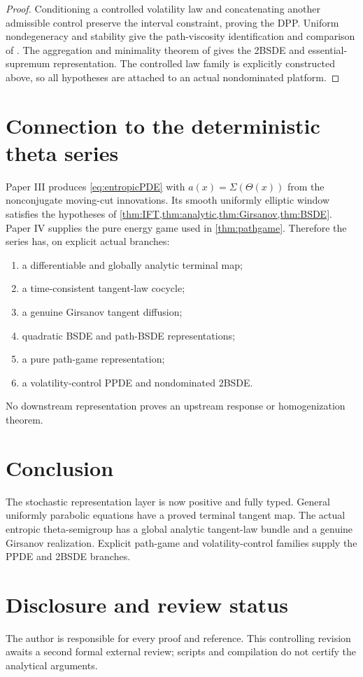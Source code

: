 \documentclass[11pt,reqno]{amsart}
\theoremstyle{definition}
\theoremstyle{remark}
\begin{document}
\begin{proof}
Conditioning a controlled volatility law and concatenating another admissible
control preserve the interval constraint, proving the DPP.  Uniform
nondegeneracy and stability give the path-viscosity identification and
comparison of \cite{EkrenTouziZhang2014I,EkrenTouziZhang2014II}.  The
aggregation and minimality theorem of \cite{SonerTouziZhang2012} gives the
2BSDE and essential-supremum representation.  The controlled law family is
explicitly constructed above, so all hypotheses are attached to an actual
nondominated platform.
\end{proof}

\section{Connection to the deterministic theta series}\label{sec:series}
Paper III produces \eqref{eq:entropicPDE} with
$a(x)=\Sigma(\Theta(x))$ from the nonconjugate moving-cut innovations.  Its
smooth uniformly elliptic window satisfies the hypotheses of
\cref{thm:IFT,thm:analytic,thm:Girsanov,thm:BSDE}.  Paper IV supplies the pure
energy game used in \cref{thm:pathgame}.  Therefore the series has, on explicit
actual branches:
\begin{enumerate}[label=(\roman*)]
\item a differentiable and globally analytic terminal map;
\item a time-consistent tangent-law cocycle;
\item a genuine Girsanov tangent diffusion;
\item quadratic BSDE and path-BSDE representations;
\item a pure path-game representation;
\item a volatility-control PPDE and nondominated 2BSDE.
\end{enumerate}
No downstream representation proves an upstream response or homogenization
theorem.

\section{Conclusion}
The stochastic representation layer is now positive and fully typed.  General
uniformly parabolic equations have a proved terminal tangent map.  The actual
entropic theta-semigroup has a global analytic tangent-law bundle and a genuine
Girsanov realization.  Explicit path-game and volatility-control families
supply the PPDE and 2BSDE branches.

\section*{Disclosure and review status}
The author is responsible for every proof and reference.  This controlling
revision awaits a second formal external review; scripts and compilation do
not certify the analytical arguments.



\end{document}

